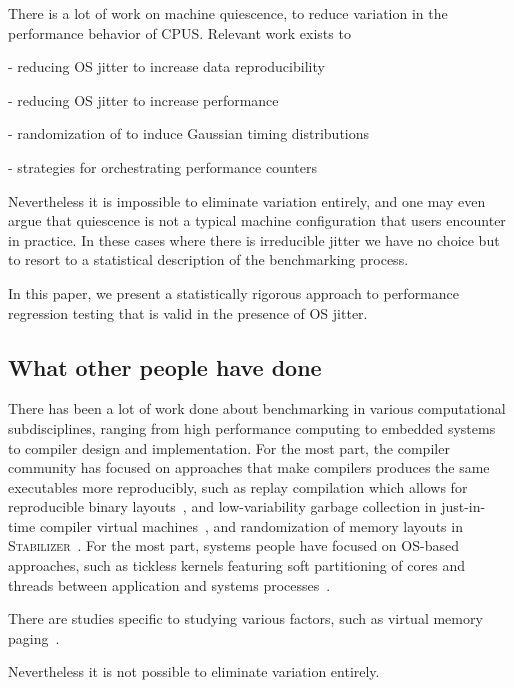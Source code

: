 \documentclass[conference]{IEEEtran}
\begin{document}
There is a lot of work on machine quiescence, to reduce variation in the performance
behavior of CPUS. Relevant work exists to

- reducing OS jitter to increase data reproducibility

- reducing OS jitter to increase performance

- randomization of  to induce Gaussian timing distributions

- strategies for orchestrating performance counters

Nevertheless it is impossible to eliminate variation
entirely, and one may even argue that quiescence is not a typical machine
configuration that users encounter in practice.
In these cases where there is irreducible jitter we have no choice but to resort to a statistical description of the benchmarking process.

In this paper, we present a statistically rigorous approach to performance regression
testing that is valid in the presence of OS jitter.



\subsection{What other people have done}

There has been a lot of work done about benchmarking in various computational subdisciplines, ranging from high performance computing to embedded systems to compiler design and implementation. For the most part, the compiler community has focused on approaches that make compilers produces the same executables more reproducibly, such as replay compilation which allows for reproducible binary layouts~\cite{Georges2008}, and low-variability garbage collection in just-in-time compiler virtual machines~\cite{Huang2004}, and randomization of memory layouts in \textsc{Stabilizer}~\cite{Curtsinger2013}. For the most part, systems people have focused on OS-based approaches, such as tickless kernels featuring soft partitioning of cores and threads between application and systems processes~\cite{Akkan2012}.

There are studies specific to studying various factors, such as virtual memory paging~\cite{Oyama2014,Oyama2016}.

Nevertheless it is not possible to eliminate variation entirely.
\end{document}
